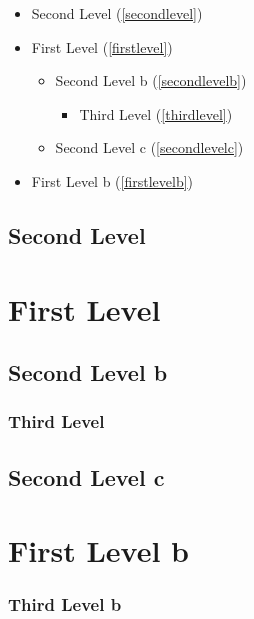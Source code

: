 
\def\mytitle{Table of Contents Test}


\begin{itemize}
\item Second Level (\autoref{secondlevel})

\item First Level (\autoref{firstlevel})

\begin{itemize}
\item Second Level b (\autoref{secondlevelb})

\begin{itemize}
\item Third Level (\autoref{thirdlevel})

\end{itemize}

\item Second Level c (\autoref{secondlevelc})

\end{itemize}

\item First Level b (\autoref{firstlevelb})

\end{itemize}

\chapter{Second Level}
\label{secondlevel}

\part{First Level}
\label{firstlevel}

\chapter{Second Level b}
\label{secondlevelb}

\section{Third Level}
\label{thirdlevel}

\chapter{Second Level c}
\label{secondlevelc}

\part{First Level b}
\label{firstlevelb}

\section{Third Level b}
\label{thirdlevelb}




